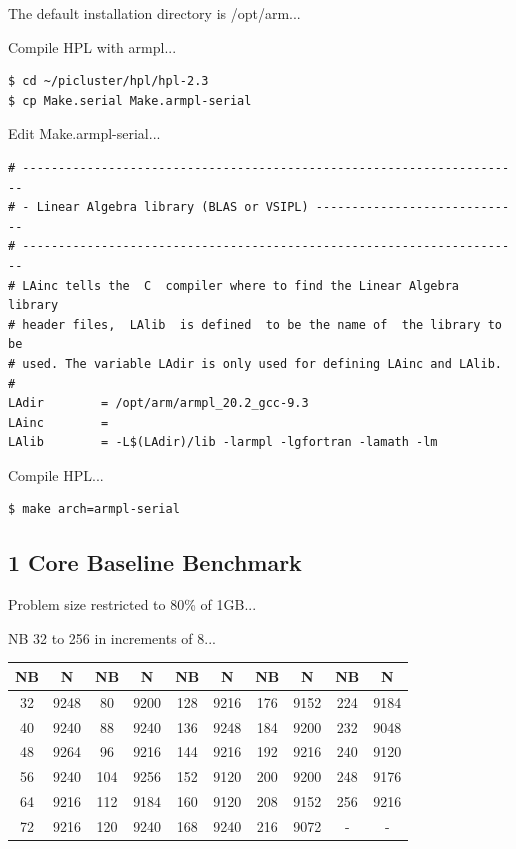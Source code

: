 \documentclass{article}
\begin{document}
The default installation directory is /opt/arm...

Compile HPL with armpl...

\begin{lstlisting}[]
$ cd ~/picluster/hpl/hpl-2.3
$ cp Make.serial Make.armpl-serial
\end{lstlisting}

Edit Make.armpl-serial...

\begin{lstlisting}[]
# ----------------------------------------------------------------------
# - Linear Algebra library (BLAS or VSIPL) -----------------------------
# ----------------------------------------------------------------------
# LAinc tells the  C  compiler where to find the Linear Algebra  library
# header files,  LAlib  is defined  to be the name of  the library to be 
# used. The variable LAdir is only used for defining LAinc and LAlib.
#
LAdir        = /opt/arm/armpl_20.2_gcc-9.3
LAinc        =
LAlib        = -L$(LAdir)/lib -larmpl -lgfortran -lamath -lm
\end{lstlisting}

Compile HPL...

\begin{lstlisting}[]
$ make arch=armpl-serial
\end{lstlisting}




\subsection{1 Core Baseline Benchmark}

Problem size restricted to 80\% of 1GB...

NB 32 to 256 in increments of 8...

\begin{center}
	\begin{tabular}{ |c|c|c|c|c|c|c|c|c|c| } 
		\hline
		NB & N & NB & N & NB & N & NB & N & NB & N \\ 
		\hline
		32 & 9248 &  80 & 9200 & 128 & 9216 & 176 & 9152 & 224 & 9184 \\ 
		40 & 9240 &  88 & 9240 & 136 & 9248 & 184 & 9200 & 232 & 9048 \\ 
 		48 & 9264 &  96 & 9216 & 144 & 9216 & 192 & 9216 & 240 & 9120 \\
		56 & 9240 & 104 & 9256 & 152 & 9120 & 200 & 9200 & 248 & 9176 \\ 
 		64 & 9216 & 112 & 9184 & 160 & 9120 & 208 & 9152 & 256 & 9216 \\
		72 & 9216 & 120 & 9240 & 168 & 9240 & 216 & 9072 &   - &    - \\ 
 		\hline
	\end{tabular}
\end{center}
\end{document}
